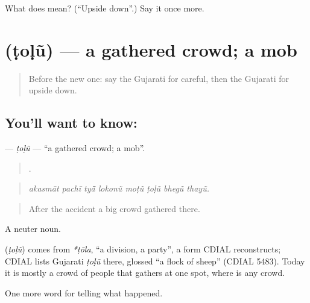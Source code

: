 \begin{tcolorbox}[breakable,colback=teal!4,colframe=teal!35!black,title={Before you move on}]
What does  mean? (\textquotedblleft{}Upside down\textquotedblright{}.) Say it once more.
\end{tcolorbox}
\section[\texorpdfstring{\gu{ટોળું} (ṭoḷũ)}{ટોળું (ṭoḷũ)}]{ (ṭoḷũ) — a gathered crowd; a mob}

\label{lesson:GU-C297-tolu}



\begin{quote}
Before the new one: say the Gujarati for careful, then the Gujarati for upside down.
\end{quote}

\subsection*{You'll want to know: }
\textbf{} — \emph{ṭoḷũ} — \textquotedblleft{}a gathered crowd; a mob\textquotedblright{}.

\begin{quote}
       .
\end{quote}

\begin{quote}
\emph{akasmāt pachī tyā̃ lokonũ moṭũ ṭoḷũ bhegũ thayũ.}
\end{quote}

\begin{quote}
After the accident a big crowd gathered there.
\end{quote}

A neuter noun.

\begin{cousinweb}
\textbf{} (\emph{ṭoḷũ}) comes from \emph{*ṭōla}, \textquotedblleft{}a division, a party\textquotedblright{}, a form CDIAL reconstructs; CDIAL lists Gujarati \emph{ṭoḷũ} there, glossed \textquotedblleft{}a flock of sheep\textquotedblright{} (CDIAL 5483). Today it is mostly a crowd of people that gathers at one spot, where \textbf{} is any crowd.
\end{cousinweb}

\begin{grammarlens}[title={What you've built}]
One more word for telling what happened.
\end{grammarlens}

